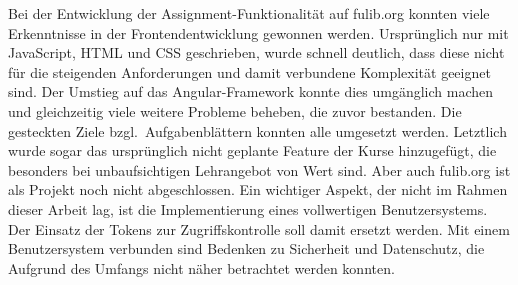 Bei der Entwicklung der Assignment-Funktionalität auf fulib.org konnten viele Erkenntnisse in der Frontendentwicklung gewonnen werden.
Ursprünglich nur mit JavaScript, HTML und CSS geschrieben, wurde schnell deutlich, dass diese nicht für die steigenden Anforderungen und damit verbundene Komplexität geeignet sind.
Der Umstieg auf das Angular-Framework konnte dies umgänglich machen und gleichzeitig viele weitere Probleme beheben, die zuvor bestanden.
Die gesteckten Ziele bzgl.\ Aufgabenblättern konnten alle umgesetzt werden.
Letztlich wurde sogar das ursprünglich nicht geplante Feature der Kurse hinzugefügt, die besonders bei unbaufsichtigen Lehrangebot von Wert sind.
Aber auch fulib.org ist als Projekt noch nicht abgeschlossen.
Ein wichtiger Aspekt, der nicht im Rahmen dieser Arbeit lag, ist die Implementierung eines vollwertigen Benutzersystems.
Der Einsatz der Tokens zur Zugriffskontrolle soll damit ersetzt werden.
Mit einem Benutzersystem verbunden sind Bedenken zu Sicherheit und Datenschutz, die Aufgrund des Umfangs nicht näher betrachtet werden konnten.
